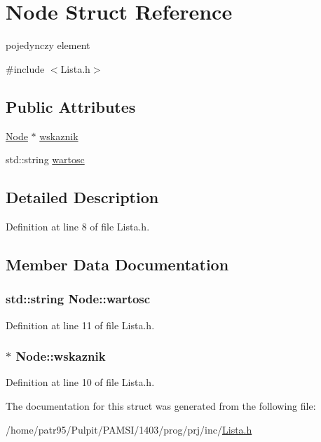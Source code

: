 \hypertarget{struct_node}{\section{Node Struct Reference}
\label{struct_node}
}


pojedynczy element  




{\ttfamily \#include $<$Lista.\-h$>$}

\subsection*{Public Attributes}
\begin{DoxyCompactItemize}
\item 
\hyperlink{struct_node}{Node} $\ast$ \hyperlink{struct_node_a738fc042ebfbe87177d8b3dbf9b7ba8e}{wskaznik}
\item 
std\-::string \hyperlink{struct_node_a27b5f552615a84991370e185f4390fba}{wartosc}
\end{DoxyCompactItemize}


\subsection{Detailed Description}


Definition at line 8 of file Lista.\-h.



\subsection{Member Data Documentation}
\hypertarget{struct_node_a27b5f552615a84991370e185f4390fba}{
\subsubsection[{wartosc}]{\setlength{\rightskip}{0pt plus 5cm}std\-::string Node\-::wartosc}}\label{struct_node_a27b5f552615a84991370e185f4390fba}


Definition at line 11 of file Lista.\-h.

\hypertarget{struct_node_a738fc042ebfbe87177d8b3dbf9b7ba8e}{
\subsubsection[{wskaznik}]{$\ast$ Node\-::wskaznik}}\label{struct_node_a738fc042ebfbe87177d8b3dbf9b7ba8e}


Definition at line 10 of file Lista.\-h.



The documentation for this struct was generated from the following file\-:\begin{DoxyCompactItemize}
\item 
/home/patr95/\-Pulpit/\-P\-A\-M\-S\-I/1403/prog/prj/inc/\hyperlink{_lista_8h}{Lista.\-h}\end{DoxyCompactItemize}
